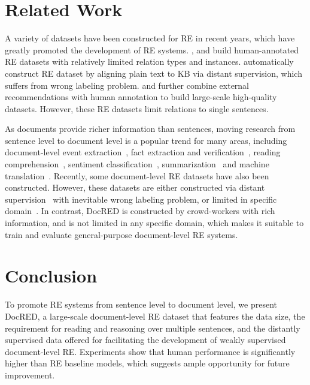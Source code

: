 \documentclass[11pt,a4paper]{article}
\begin{document}
\section{Related Work}

A variety of datasets have been constructed for RE in recent years, which have greatly promoted the development of RE systems. ,  and  build human-annotated RE datasets with relatively limited relation types and instances.  automatically construct RE dataset by aligning plain text to KB via distant supervision, which suffers from wrong labeling problem.  and  further combine external recommendations with human annotation to build large-scale high-quality datasets. However, these RE datasets limit relations to single sentences.


As documents provide richer information than sentences, moving research from sentence level to document level is a popular trend for many areas, including document-level event extraction~\cite{walker2006ace,DBLP:conf/tac/MitamuraLH15,DBLP:conf/tac/MitamuraLH17}, fact extraction and verification~\cite{DBLP:conf/naacl/ThorneVCM18}, reading comprehension~\cite{DBLP:conf/nips/NguyenRSGTMD16, joshi2017triviaqa,lai2017race}, sentiment classification~\cite{DBLP:conf/acl/PangL04,DBLP:conf/acl/PrettenhoferS10}, summarization~\cite{DBLP:conf/conll/NallapatiZSGX16} and machine translation~\cite{DBLP:conf/emnlp/ZhangLSZXZL18}. 
Recently, some document-level RE datasets have also been constructed. However, these datasets are either constructed via distant supervision~\cite{quirk2017distant,peng2017nary} with inevitable wrong labeling problem, or limited in specific domain~\cite{li2016biocreative,peng2017nary}. In contrast, DocRED is constructed by crowd-workers with rich information, and is not limited in any specific domain, which makes it suitable to train and evaluate general-purpose document-level RE systems.


\section{Conclusion}
To promote RE systems from sentence level to document level, we present DocRED, a large-scale document-level RE dataset that features the data size, the requirement for reading and reasoning over multiple sentences, and the distantly supervised data offered for  facilitating the development of weakly supervised document-level RE. Experiments show that human performance is significantly higher than RE baseline models, which suggests ample opportunity for future improvement.
\end{document}
